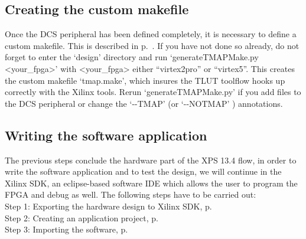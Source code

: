 \documentclass[a4paper,oneside]{memoir}
\begin{document}
\subsection{Creating the custom makefile}\label{sec:creating_makefile_blaze}

Once the DCS peripheral has been defined completely, it is necessary to define a custom makefile. This is described in p.\ \pageref{sec:creating_makefile}. If you have not done so already, do not forget to enter the `design' directory and run `generateTMAPMake.py <your\_fpga>' with <your\_fpga> either ``virtex2pro'' or ``virtex5''. This creates the custom makefile `tmap.make', which insures the TLUT toolflow hooks up correctly with the Xilinx tools. Rerun `generateTMAPMake.py' if you add files to the DCS peripheral or change the `-\--TMAP' (or `-\--NOTMAP' ) annotations.

\subsection{Writing the software application}\label{sec:writing_software_blaze}

The previous steps conclude the hardware part of the XPS 13.4 flow, in order to write the software application and to test the design, we will continue in the Xilinx SDK, an eclipse-based software IDE which allows the user to program the FPGA and debug as well. The following steps have to be carried out:
\\   
Step 1: Exporting the hardware design to Xilinx SDK, p.\ \pageref{sec:expot_sdk_blaze}\\
Step 2: Creating an application project, p.\ \pageref{sec:creating_application_blaze}\\
Step 3: Importing the software, p.\ \pageref{sec:import_software_blaze}\\
\end{document}

